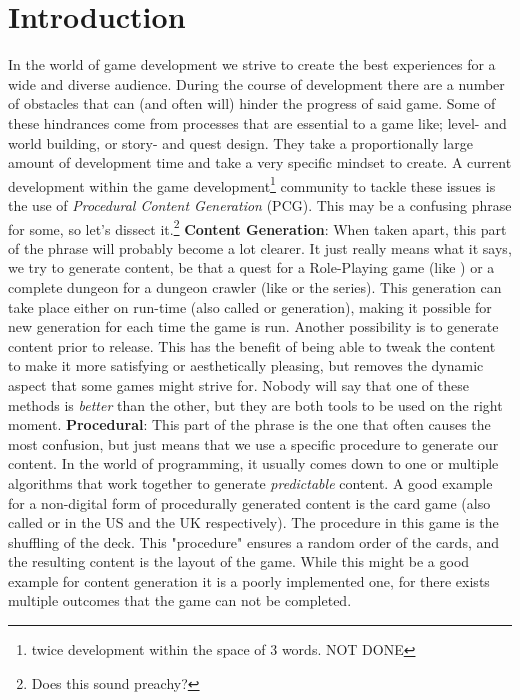 
\chapter{Introduction}
In the world of game development we strive to create the best experiences for a wide and diverse audience. During the course of development there are a number of obstacles that can (and often will) hinder the progress of said game. Some of these hindrances come from processes that are essential to a game like; level- and world building, or story- and quest design. They take a proportionally large amount of development time and take a very specific mindset to create. 
A current development within the game development\footnote{twice development within the space of 3 words. NOT DONE} community to tackle these issues is the use of \textit{Procedural Content Generation} (PCG). This may be a confusing phrase for some, so let's dissect it.\footnote{Does this sound preachy?}
\textbf{Content Generation}: When taken apart, this part of the phrase will probably become a lot clearer. It just really means what it says, we try to generate content, be that a quest for a Role-Playing game (like ) or a complete dungeon for a dungeon crawler (like  or the  series). This generation can take place either on run-time (also called  or  generation), making it possible for new generation for each time the game is run. Another possibility is to generate content prior to release. This has the benefit of being able to tweak the content to make it more satisfying or aesthetically pleasing, but removes the dynamic aspect that some games might strive for. Nobody will say that one of these methods is \emph{better} than the other, but they are both tools to be used on the right moment.
\textbf{Procedural}: This part of the phrase is the one that often causes the most confusion, but just means that we use a specific procedure to generate our content. In the world of programming, it usually comes down to one or multiple algorithms that work together to generate \emph{predictable} content. A good example for a non-digital form of procedurally generated content is the card game  (also called  or  in the US and the UK respectively). The procedure in this game is the shuffling of the deck. This "procedure" ensures a random order of the cards, and the resulting content is the layout of the game. While this might be a good example for content generation it is a poorly implemented one, for there exists multiple outcomes that the game can not be completed.


